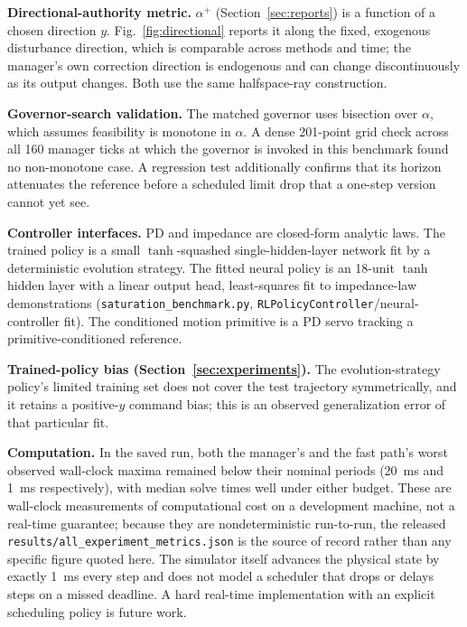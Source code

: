 \documentclass[journal]{IEEEtran}
\begin{document}
\textbf{Directional-authority metric.} $\alpha^+$ (Section~\ref{sec:reports}) is a function of a chosen direction $y$. Fig.~\ref{fig:directional} reports it along the fixed, exogenous disturbance direction, which is comparable across methods and time; the manager's own correction direction is endogenous and can change discontinuously as its output changes. Both use the same halfspace-ray construction.

\textbf{Governor-search validation.} The matched governor uses bisection over $\alpha$, which assumes feasibility is monotone in $\alpha$. A dense 201-point grid check across all 160 manager ticks at which the governor is invoked in this benchmark found no non-monotone case. A regression test additionally confirms that its horizon attenuates the reference before a scheduled limit drop that a one-step version cannot yet see.

\textbf{Controller interfaces.} PD and impedance are closed-form analytic laws. The trained policy is a small $\tanh$-squashed single-hidden-layer network fit by a deterministic evolution strategy. The fitted neural policy is an 18-unit $\tanh$ hidden layer with a linear output head, least-squares fit to impedance-law demonstrations (\texttt{saturation\_benchmark.py}, \texttt{RLPolicyController}/neural-controller fit). The conditioned motion primitive is a PD servo tracking a primitive-conditioned reference.

\textbf{Trained-policy bias (Section~\ref{sec:experiments}).} The evolution-strategy policy's limited training set does not cover the test trajectory symmetrically, and it retains a positive-$y$ command bias; this is an observed generalization error of that particular fit.

\textbf{Computation.} In the saved run, both the manager's and the fast path's worst observed wall-clock maxima remained below their nominal periods (20~ms and 1~ms respectively), with median solve times well under either budget. These are wall-clock measurements of computational cost on a development machine, not a real-time guarantee; because they are nondeterministic run-to-run, the released \texttt{results/all\_experiment\_metrics.json} is the source of record rather than any specific figure quoted here. The simulator itself advances the physical state by exactly 1~ms every step and does not model a scheduler that drops or delays steps on a missed deadline. A hard real-time implementation with an explicit scheduling policy is future work.
\end{document}
